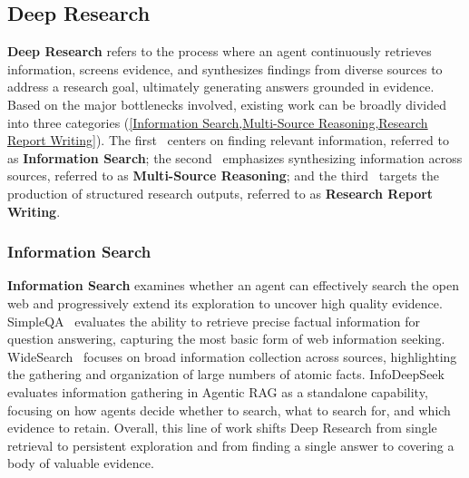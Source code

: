 \documentclass{llmxive}
\begin{document}
\subsection{Deep Research}
\label{sec:Deep Research}

\textbf{Deep Research} refers to the process where an agent continuously retrieves information, screens evidence, and synthesizes findings from diverse sources to address a research goal, ultimately generating answers grounded in evidence. Based on the major bottlenecks involved, existing work can be broadly divided into three categories (\cref{Information Search,Multi-Source Reasoning,Research Report Writing}). The first~\cite{WebWalker,WideSearch,InfoDeepSeek} centers on finding relevant information, referred to as \textbf{Information Search}; the second~\cite{GAIA,BrowseComp,Conflicts,BrowseComp-ZH} emphasizes synthesizing information across sources, referred to as \textbf{Multi-Source Reasoning}; and the third~\cite{DeepResearch-Bench,DeepResearchGym,DR_BENCH} targets the production of structured research outputs, referred to as \textbf{Research Report Writing}.


\subsubsection{Information Search}
\label{Information Search}
\textbf{Information Search} examines whether an agent can effectively search the open web and progressively extend its exploration to uncover high quality evidence. SimpleQA~\cite{SimpleQA} evaluates the ability to retrieve precise factual information for question answering, capturing the most basic form of web information seeking. 
WideSearch~\cite{WideSearch} focuses on broad information collection across sources, highlighting the gathering and organization of large numbers of atomic facts. 
InfoDeepSeek~\cite{InfoDeepSeek} evaluates information gathering in Agentic RAG as a standalone capability, focusing on how agents decide whether to search, what to search for, and which evidence to retain.
Overall, this line of work shifts Deep Research from single retrieval to persistent exploration and from finding a single answer to covering a body of valuable evidence.
\end{document}
